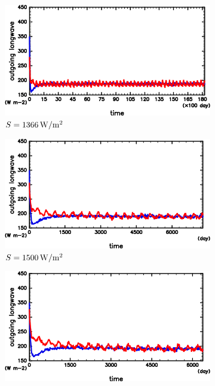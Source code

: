 \documentclass[body]{subfiles}
\begin{document}
\begin{figure}[t]
	\centering
	\begin{subfigure}{.4\textwidth}
		\centering
		\includegraphics[width=\columnwidth]{S1366/S1366_OLRA-OSRA_horimean_time0.0-18250.0-crop.png}
		\caption{\(S=1366\hmu{W/m^2}\)}
	\end{subfigure}
	\begin{subfigure}{.4\textwidth}
		\centering
		\includegraphics[width=\columnwidth]{S1500/S1500_OLRA-OSRA_horimean_time0.0-7300.0-crop.png}
		\caption{\(S=1500\hmu{W/m^2}\)}
	\end{subfigure}
	\begin{subfigure}{.4\textwidth}
		\centering
		\includegraphics[width=\columnwidth]{S1600/S1600_OLRA-OSRA_horimean_time0.0-7300.0-crop.png}

\end{subfigure}
\end{figure}
\end{document}
